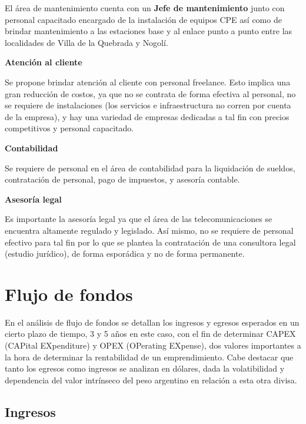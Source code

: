 \documentclass[12pt,a4paper]{book}
\begin{document}
\medskip 

El área de mantenimiento cuenta con un \textbf{Jefe de mantenimiento} junto con personal capacitado encargado de la instalación de equipos CPE así como de brindar mantenimiento a las estaciones base y al enlace punto a punto entre las localidades de Villa de la Quebrada y Nogolí.

\medskip 

\noindent \textbf{Atención al cliente}

\medskip 

Se propone brindar atención al cliente con personal freelance. Esto implica una gran reducción de costos, ya que no se contrata de forma efectiva al personal, no se requiere de instalaciones (los servicios e infraestructura no corren por cuenta de la empresa), y hay una variedad de empresas dedicadas a tal fin con precios competitivos y personal capacitado.

\medskip 

\noindent \textbf{Contabilidad}

\medskip 

Se requiere de personal en el área de contabilidad para la liquidación de sueldos, contratación de personal, pago de impuestos, y asesoría contable.

\medskip 

\noindent \textbf{Asesoría legal}

Es importante la asesoría legal ya que el área de las telecomunicaciones se encuentra altamente regulado y legislado. Así mismo, no se requiere de personal efectivo para tal fin por lo que se plantea la contratación de una consultora legal (estudio jurídico), de forma esporádica y no de forma permanente.  

\section{Flujo de fondos}

En el análisis de flujo de fondos se detallan los ingresos y egresos esperados en un cierto plazo de tiempo, 3 y 5 años en este caso, con el fin de determinar CAPEX (CAPital EXpenditure) y OPEX (OPerating EXpense), dos valores importantes a la hora de determinar la rentabilidad de un emprendimiento. Cabe destacar que tanto los egresos como ingresos se analizan en dólares, dada la volatibilidad y dependencia del valor intrínseco del peso argentino en relación a esta otra divisa.

\subsection{Ingresos}
\end{document}
